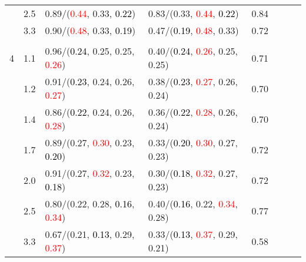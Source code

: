 \documentclass[10pt,a4paper]{report}
\begin{document}
\begin{table}[!htbp]
\begin{center}
{\begin{tabular}{ccllcccc}
			&2.5&0.89/(\textcolor{red}{0.44}, 0.33, \textcolor{black}{0.22})&0.83/(0.33, \textcolor{red}{0.44}, \textcolor{black}{0.22})&0.84\\
			&3.3&0.90/(\textcolor{red}{0.48}, 0.33, \textcolor{black}{0.19})&0.47/(\textcolor{black}{0.19}, \textcolor{red}{0.48}, 0.33)&0.72\\
			&&&&\\
			4			&1.1&0.96/(\textcolor{black}{0.24}, 0.25, 0.25, \textcolor{red}{0.26})&0.40/(\textcolor{black}{0.24}, \textcolor{red}{0.26}, 0.25, 0.25)&0.71\\
			&1.2&0.91/(\textcolor{black}{0.23}, 0.24, 0.26, \textcolor{red}{0.27})&0.38/(\textcolor{black}{0.23}, \textcolor{red}{0.27}, 0.26, 0.24)&0.70\\
			&1.4&0.86/(\textcolor{black}{0.22}, 0.24, 0.26, \textcolor{red}{0.28})&0.36/(\textcolor{black}{0.22}, \textcolor{red}{0.28}, 0.26, 0.24)&0.70\\
			&1.7&0.89/(0.27, \textcolor{red}{0.30}, 0.23, \textcolor{black}{0.20})&0.33/(\textcolor{black}{0.20}, \textcolor{red}{0.30}, 0.27, 0.23)&0.72\\
			&2.0&0.91/(0.27, \textcolor{red}{0.32}, 0.23, \textcolor{black}{0.18})&0.30/(\textcolor{black}{0.18}, \textcolor{red}{0.32}, 0.27, 0.23)&0.72\\
			&2.5&0.80/(0.22, 0.28, \textcolor{black}{0.16}, \textcolor{red}{0.34})&0.40/(\textcolor{black}{0.16}, 0.22, \textcolor{red}{0.34}, 0.28)&0.77\\
			&3.3&0.67/(0.21, \textcolor{black}{0.13}, 0.29, \textcolor{red}{0.37})&0.33/(\textcolor{black}{0.13}, \textcolor{red}{0.37}, 0.29, 0.21)&0.58\\
			\bottomrule
		\end{tabular}}
	\end{center}
\end{table}
\end{document}
